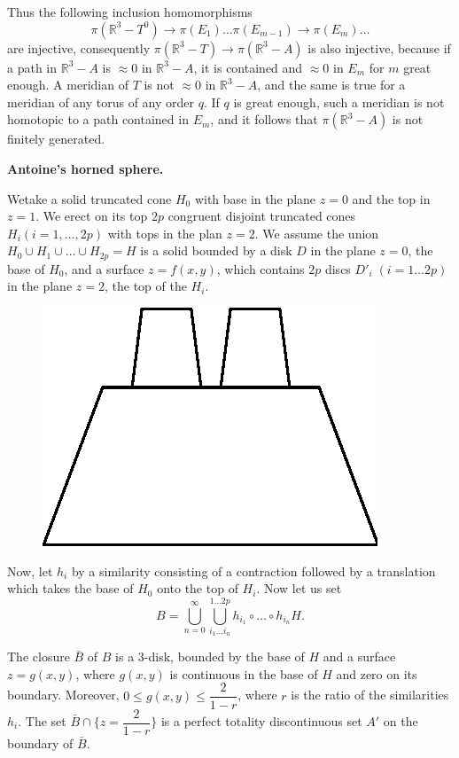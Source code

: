 Thus the following inclusion homomorphisms 
$$
\pi(\mathbb{R}^3 - T^0 ) \to \pi(E_1) \ldots \pi(E_{m-1}) \to \pi(E_m) 
\ldots 
$$
are injective, consequently $\pi (\mathbb{R}^3 - T) \to \pi
(\mathbb{R}^3 -A)$ is also injective, because if a path in
$\mathbb{R}^3 - A $ is $\approx 0$ in $\mathbb{R}^3 -A$, it is
contained and $\approx 0$ in $E_m$ for $m$ great enough. A meridian of
$T$ is not $\approx 0$ in $\mathbb{R}^3 - A$, and the same is true for
a meridian of any torus of any order $q$. If $q$ is great enough, such
a meridian is not homotopic to a path contained in $E_{m}$, and it
follows that $\pi(\mathbb{R}^3 - A)$ is not finitely generated. 

\medskip
\noindent\textbf{Antoine's horned sphere.}

We\pageoriginale take a solid truncated cone $H_0$ with base in the
plane $z = 0$ 
and the top in $z = 1$. We erect on its top $2p$ congruent disjoint
truncated cones $H_i (i= 1, \ldots, 2p)$ with tops in the plan $z =
2$. We assume the union $H_0 \cup H_1 \cup \ldots \cup H_{2p} = H$ is
a solid bounded by a disk $D$ in the plane $z =0$, the base of $H_0$,
and a surface $z = f(x, y)$, which contains $2p$ discs $D'_i \; (i = 1
\ldots 2p)$ in the plane $z =2$, the top of the $H_i$. 
\begin{figure}[H]
\centering
\includegraphics{vol44-fig/fig44-10.eps}
\end{figure}

Now, let $h_i$ by a similarity consisting of a contraction followed by
a translation which takes the base of $H_0$ onto the top of $H_i$. Now
let us set  
$$ 
B = \bigcup^{\infty}_{n=0} \bigcup^{1 \ldots 2p}_{i_1 \ldots i_n}
h_{i_{1}} \circ\ldots \circ h_{i_{n}} H. 
$$

The closure $\bar{B}$ of $B$ is a 3-disk, bounded by the base of $H$
and a surface $z = g(x, y)$, where $g(x,y)$ is continuous in the base
of $H$ and zero on its boundary. Moreover, $0 \leq g(x, y) \leq
\dfrac{2}{1-r}$, where $r$ is the ratio of the similarities $h_i$. The
set $\bar{B} \cap \{ z = \dfrac{2}{1-r}\}$ is a perfect totality
discontinuous set $A'$ on the boundary of $\bar{B}$. 

